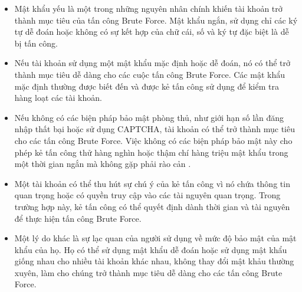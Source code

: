 \begin{itemize}
    \item Mật khẩu yếu là một trong những nguyên nhân chính khiến tài khoản trở thành mục tiêu của tấn công Brute Force. Mật khẩu ngắn, sử dụng chỉ các ký tự dễ đoán hoặc không có sự kết hợp của chữ cái, số và ký tự đặc biệt là dễ bị tấn công.
    \item Nếu tài khoản sử dụng một mật khẩu mặc định hoặc dễ đoán, nó có thể trở thành mục tiêu dễ dàng cho các cuộc tấn công Brute Force. Các mật khẩu mặc định thường được biết đến và được kẻ tấn công sử dụng để kiểm tra hàng loạt các tài khoản.
    \item Nếu không có các biện pháp bảo mật phòng thủ, như giới hạn số lần đăng nhập thất bại hoặc sử dụng CAPTCHA, tài khoản có thể trở thành mục tiêu cho các tấn công Brute Force. Việc không có các biện pháp bảo mật này cho phép kẻ tấn công thử hàng nghìn hoặc thậm chí hàng triệu mật khẩu trong một thời gian ngắn mà không gặp phải rào cản \cite{stiawan2019investigating}.
    \item Một tài khoản có thể thu hút sự chú ý của kẻ tấn công vì nó chứa thông tin quan trọng hoặc có quyền truy cập vào các tài nguyên quan trọng. Trong trường hợp này, kẻ tấn công có thể quyết định dành thời gian và tài nguyên để thực hiện tấn công Brute Force.
    \item Một lý do khác là sự lạc quan của người sử dụng về mức độ bảo mật của mật khẩu của họ. Họ có thể sử dụng mật khẩu dễ đoán hoặc sử dụng mật khẩu giống nhau cho nhiều tài khoản khác nhau, không thay đổi mật khảu thường xuyên, làm cho chúng trở thành mục tiêu dễ dàng cho các tấn công Brute Force.
\end{itemize}
